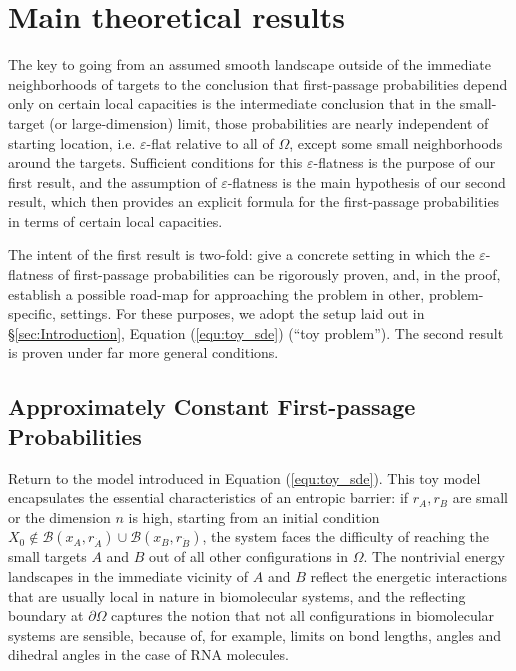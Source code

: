 \documentclass[nofootinbib,english, aip, jcp, priprint, graphicx,floatfix]{revtex4-1}
\theoremstyle{plain}
\theoremstyle{definition}
\theoremstyle{plain}
\newcommand{\bb}[1]{\mathcal{B}\left(#1\right)}
\newcommand{\dA}{{\dot A}}
\begin{document}
\section{Main theoretical results}
\label{sec:MainResults}

The key to going from an assumed smooth landscape outside of the immediate neighborhoods of targets to the conclusion that first-passage probabilities depend only on certain local capacities is the intermediate conclusion that in the small-target (or large-dimension) limit, those probabilities are nearly independent of starting location, i.e. $\varepsilon$-flat relative to all of $\Omega$, except some small neighborhoods around the targets.
Sufficient conditions for this $\varepsilon$-flatness is the purpose of our first result, and the assumption of 
$\varepsilon$-flatness is the main hypothesis of our second result, which then provides an explicit formula for the first-passage probabilities in terms of certain local capacities.

The intent of the first result is two-fold: give a concrete setting in which the $\varepsilon$-flatness of first-passage probabilities can be rigorously proven, and, in the proof, establish a possible road-map for approaching the problem in other, problem-specific, settings. For these purposes, we adopt the setup laid out in \S\ref{sec:Introduction}, Equation (\ref{equ:toy_sde}) (``toy problem'').
The second result is proven under far more general conditions.

\subsection{Approximately Constant First-passage Probabilities}
\label{subsec:ApproximatelyConstant}

Return to the model introduced in Equation (\ref{equ:toy_sde}).
This toy model encapsulates the essential characteristics of an entropic barrier: if $r_A, r_B$ are small or the dimension $n$ is high, starting from an initial condition $X_0 \not\in \bb{x_A,r_\dA} \cup \bb{x_B,r_{\dot B}}$, the system faces the difficulty of reaching the small targets $A$ and $B$ out of all other configurations in $\Omega$. The nontrivial energy landscapes in the immediate vicinity of $A$ and $B$ reflect the energetic interactions that are usually local in nature in biomolecular systems, and the reflecting boundary at $\partial\Omega$ captures the notion that not all configurations in biomolecular systems are sensible, because of, for example, limits on bond lengths, angles and dihedral angles in the case of RNA molecules.
\end{document}
